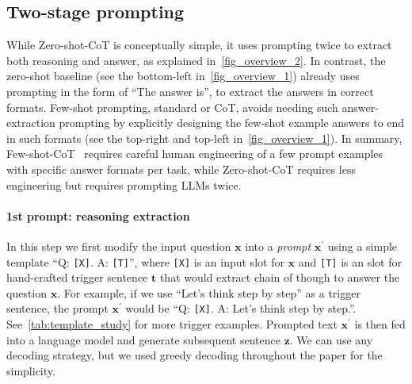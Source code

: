 \documentclass{article}
\newcommand{\sg}[1]{{\color{orange}[{#1} --SG]}}
\newcommand{\CoT}{chain of thought\xspace}
\newcommand{\ours}{Zero-shot-CoT\xspace}
\newcommand{\theirs}{Few-shot-CoT\xspace}
\begin{document}
\subsection{Two-stage prompting} 

While \ours is conceptually simple, it uses prompting twice to extract both reasoning and answer, as explained in~\autoref{fig_overview_2}. In contrast, the zero-shot baseline (see the bottom-left in~\autoref{fig_overview_1}) already uses prompting in the form of ``The answer is'', to extract the answers in correct formats. Few-shot prompting, standard or CoT, avoids needing such answer-extraction prompting by explicitly designing the few-shot example answers to end in such formats (see the top-right and top-left in~\autoref{fig_overview_1}). In summary, \theirs~\citep{cot_wei} requires careful human engineering of a few prompt examples with specific answer formats per task, while \ours requires less engineering but requires prompting LLMs twice.

\paragraph{1st prompt: reasoning extraction} In this step we first modify the input question $\mathbf{x}$ into a \textit{prompt} $\mathbf{x}^{\prime}$ using a simple template ``Q: \texttt{[X]}. A: \texttt{[T]}'', where \texttt{[X]} is an input slot for $\mathbf{x}$ and \texttt{[T]} is an slot for hand-crafted trigger sentence $\mathbf{t}$ that would extract chain of though to answer the question $\mathbf{x}$. 
For example, if we use ``Let's think step by step'' as a trigger sentence, the prompt $\mathbf{x}^{\prime}$ would be ``Q: \texttt{[X]}. A: Let's think step by step.''. 
See~\autoref{tab:template_study} for more trigger examples.
Prompted text $\mathbf{x}^{\prime}$ is then fed into a language model and generate subsequent sentence $\mathbf{z}$. 
We can use any decoding strategy, but we used greedy decoding throughout the paper for the simplicity. 

\end{document}
